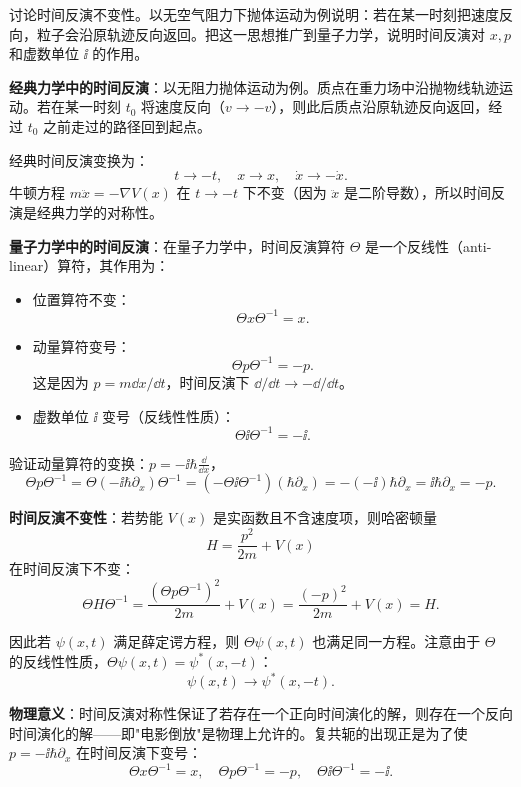 \begin{question}
讨论时间反演不变性。以无空气阻力下抛体运动为例说明：若在某一时刻把速度反向，粒子会沿原轨迹反向返回。把这一思想推广到量子力学，说明时间反演对 $x,p$ 和虚数单位 $\ii$ 的作用。
\end{question}
\begin{solution}
	\textbf{经典力学中的时间反演}：以无阻力抛体运动为例。质点在重力场中沿抛物线轨迹运动。若在某一时刻 $t_0$ 将速度反向（$v\to -v$），则此后质点沿原轨迹反向返回，经过 $t_0$ 之前走过的路径回到起点。

	经典时间反演变换为：
	\[
	t \to -t,\quad x \to x,\quad \dot x \to -\dot x.
	\]
	牛顿方程 $m\ddot x = -\nabla V(x)$ 在 $t\to -t$ 下不变（因为 $\ddot x$ 是二阶导数），所以时间反演是经典力学的对称性。

	\textbf{量子力学中的时间反演}：在量子力学中，时间反演算符 $\Theta$ 是一个反线性（anti-linear）算符，其作用为：
	\begin{itemize}
	\item 位置算符不变：
	\[
	\Theta x\Theta^{-1} = x.
	\]
	\item 动量算符变号：
	\[
	\Theta p\Theta^{-1} = -p.
	\]
	这是因为 $p=m\dd x/\dd t$，时间反演下 $\dd/\dd t \to -\dd/\dd t$。
	\item 虚数单位 $\ii$ 变号（反线性性质）：
	\[
	\Theta \ii\Theta^{-1} = -\ii.
	\]
	\end{itemize}

	验证动量算符的变换：$p = -\ii\hbar\frac{\dd}{\dd x}$，
	\[
	\Theta p \Theta^{-1} = \Theta(-\ii\hbar\partial_x)\Theta^{-1}
	= (-\Theta\ii\Theta^{-1})(\hbar\partial_x) = -(-\ii)\hbar\partial_x = \ii\hbar\partial_x = -p.
	\]

	\textbf{时间反演不变性}：若势能 $V(x)$ 是实函数且不含速度项，则哈密顿量
	\[
	H = \frac{p^2}{2m} + V(x)
	\]
	在时间反演下不变：
	\[
	\Theta H \Theta^{-1} = \frac{(\Theta p\Theta^{-1})^2}{2m} + V(x)
	= \frac{(-p)^2}{2m} + V(x) = H.
	\]

	因此若 $\psi(x,t)$ 满足薛定谔方程，则 $\Theta\psi(x,t)$ 也满足同一方程。注意由于 $\Theta$ 的反线性性质，$\Theta\psi(x,t) = \psi^*(x,-t)$：
	\[
	\psi(x,t) \to \psi^*(x,-t).
	\]

	\textbf{物理意义}：时间反演对称性保证了若存在一个正向时间演化的解，则存在一个反向时间演化的解——即"电影倒放"是物理上允许的。复共轭的出现正是为了使 $p=-\ii\hbar\partial_x$ 在时间反演下变号：
	\[
	\boxed{\Theta x\Theta^{-1}=x,\quad \Theta p\Theta^{-1}=-p,\quad \Theta\ii\Theta^{-1}=-\ii}.
	\]
	\end{solution}

